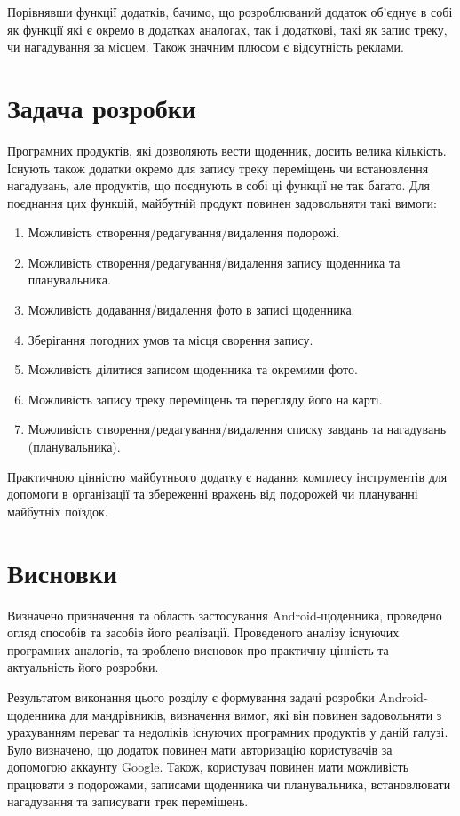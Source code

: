 \documentclass[../main.tex]{subfiles}
\begin{document}
Порівнявши функції додатків, бачимо, що розроблюваний додаток об'єднує в собі як функції які є окремо в додатках аналогах, так і додаткові, такі як запис треку, чи нагадування за місцем. Також значним плюсом є відсутність реклами.

\section{Задача розробки}

Програмних продуктів, які дозволяють вести щоденник, досить велика кількість. Існують також додатки окремо для запису треку переміщень чи встановлення нагадувань, але продуктів, що поєднують в собі ці функції не так багато. Для поєднання цих функцій, майбутній продукт повинен задовольняти такі вимоги: 

\begin{enumerate}
	\item Можливість створення/редагування/видалення подорожі.
	\item Можливість створення/редагування/видалення запису щоденника та планувальника.
	\item Можливість додавання/видалення фото в записі щоденника.
	\item Зберігання погодних умов та місця сворення запису.
	\item Можливість ділитися записом щоденника та окремими фото.
	\item Можливість запису треку переміщень та перегляду його на карті.
	\item Можливість створення/редагування/видалення списку завдань та нагадувань (планувальника).
\end{enumerate}

Практичною цінністю майбутнього додатку є надання комплесу інструментів для допомоги в організації та збереженні вражень від подорожей чи плануванні майбутніх поїздок.

\section{Висновки}

Визначено призначення та область застосування Android-щоденника, проведено огляд способів та засобів його реалізації. Проведеного аналізу існуючих програмних аналогів, та зроблено висновок про практичну цінність та актуальність його розробки.

Результатом виконання цього розділу є формування задачі розробки Android-щоденника для мандрівників, визначення вимог, які він повинен задовольняти з урахуванням переваг та недоліків існуючих програмних продуктів у даній галузі. Було визначено, що додаток повинен мати авторизацію користувачів за допомогою аккаунту Google. Також, користувач повинен мати можливість працювати з подорожами, записами щоденника чи планувальника, встановлювати нагадування та записувати трек переміщень.

\end{document}
